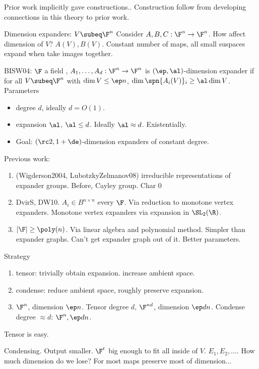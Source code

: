 Prior work implicitly gave constructions.. Construction follow from developing connections in this theory to prior work.

Dimension expanders: $V\subeq \F^n$ Consider $A,B,C:\F^n\to \F^n$. How affect dimension of $V$? $A(V),B(V)$.
Constant number of maps, all small suspaces expand when take images together. 

BISW04: $\F$ a field , $A_1,\ldots, A_d:\F^n\to \F^n$ is $(\ep,\al)$-dimension expander if for all $V\subeq \F^n$ with $\dim V\le \ep n$, $\dim \spn\{A_i(V)\}_i \ge \al \dim V$.
Parameters
\begin{itemize}
\item
degree $d$, ideally $d=O(1)$.
\item expansion $\al$, $\al\le d$. Ideally $\al\approx d$. Existentially.
\item
Goal: $(\rc2,1+\de)$-dimension expanders of constant degree.
\end{itemize}

Previous work:
\begin{enumerate}
\item (Wigderson2004, LubotzkyZelmanov08)
irreducible representations of expander groups. Before, Cayley group. Char 0
\item
DvirS, DW10. $A_i\in B^{n\times n}$ every $\F$. Via reduction to monotone vertex expanders. Monotone vertex expanders via expansion in $\SL_2(\R)$.
\item
$|\F|\ge \poly(n)$. Via linear algebra and polynomial method. Simpler than expander graphs. Can't get expander graph out of it. Better parameters.
\end{enumerate}

Strategy
\begin{enumerate}
\item
tensor: trivially obtain expansion. increase ambient space.
\item
condense: reduce ambient space, roughly preserve expansion.
\item
$\F^n$, dimension $\ep n$. Tensor degree $d$, $\F^{nd}$, dimension $\ep dn$. Condense degree $\approx d$: $\F^n, \ep d n$.
\end{enumerate}

Tensor is easy.

Condensing. Output smaller. $\F^t$ big enough to fit all inside of $V$. $E_1,E_2,\ldots$. How much dimension do we lose? For most maps preserve most of dimension...

